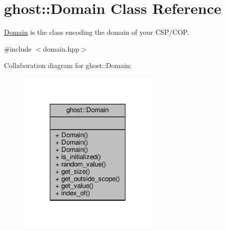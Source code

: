 \hypertarget{classghost_1_1Domain}{\section{ghost\-:\-:Domain Class Reference}
\label{classghost_1_1Domain}
}


\hyperlink{classghost_1_1Domain}{Domain} is the class encoding the domain of your C\-S\-P/\-C\-O\-P.  




{\ttfamily \#include $<$domain.\-hpp$>$}



Collaboration diagram for ghost\-:\-:Domain\-:
\nopagebreak
\begin{figure}[H]
\begin{center}
\leavevmode
\includegraphics[width=192pt]{classghost_1_1Domain__coll__graph}
\end{center}
\end{figure}
